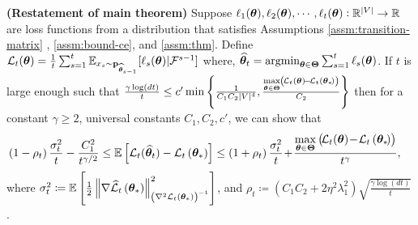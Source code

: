 \begin{customtheorem}{1}\textbf{(Restatement of main theorem)}
Suppose $\ell_{1}(\bm{\theta}), \ell_{2}(\bm{\theta}), \cdots, \ell_{t}(\bm{\theta}): \mathbb{R}^{|V|} \rightarrow \mathbb{R}$ are loss functions from a distribution that satisfies Assumptions \ref{assm:transition-matrix} , \ref{assm:bound-ce}, and \ref{assm:thm}. Define 
    ${\cal L}_t(\bm{\theta}) = \frac{1}{t}\sum_{s=1}^t\mathbb{E}_{x_s\sim \mathbf{p}_{{\widehat{\bm{\theta}}}_{s-1}}}[\ell_s(\bm{\theta})|\mathcal{F}^{s-1}]$
where, ${\widehat{\bm{\theta}}}_t =\operatorname*{argmin}_{\bm{\theta} \in \bm{\Theta}} \sum_{s = 1}^t \ell_{s}(\bm{\theta})$. If $t$ is large enough such that $ \frac{\gamma\log(dt)}{t}\leq c^{\prime} \min \left\{\frac{1}{C_{1}C_{2} |V|^4 }, \frac{\max\limits_{\bm{\theta} \in \bm{\Theta}}\left(\!{\cal L}_{t}(\bm{\theta})\!-\!{\cal L}_{t}\left(\bm{\theta}_{*}\!\right)\right)}{C_{2}}\right\}$
then for a constant $\gamma \geq 2$, universal constants $C_1,C_2,c'$,  we can show that 
\begin{align*}
\left(1-\rho_{t}\right) \frac{\sigma_t^2}{t}- \frac{C_1^2}{t^{\gamma / 2}} 
&\leq \mathbb{E}\left[{\cal L}_t({\widehat{\bm{\theta}}}_t)-{\cal L}_t\left(\bm{\theta}_{*}\right)\right] \leq \left(1+\rho_{t}\right) \frac{\sigma_t^2}{t}\!+\!\frac{\max\limits_{\bm{\theta} \in \bm{\Theta}}\left(\!{\cal L}_{t}(\bm{\theta})\!-\!{\cal L}_{t}\left(\bm{\theta}_{*}\!\right)\right)}{t^{\gamma}},
\end{align*}
where 
$\sigma^{2}_t \coloneqq \mathbb{E}_{}\left[\frac{1}{2}\left\|\nabla \widehat{\cal L}_{t}\left(\bm{\theta}_{*}\right)\right\|_{\left(\nabla^{2} {\cal L}_t\left(\bm{\theta}_{*}\right)\right)^{-1}}^{2}\right]$, 
and $\rho_t \coloneqq \left(C_1C_2 + 2\eta^2\lambda_1^2\right)\sqrt{\frac{\gamma\log(dt)}{t}}$.
\end{customtheorem}



